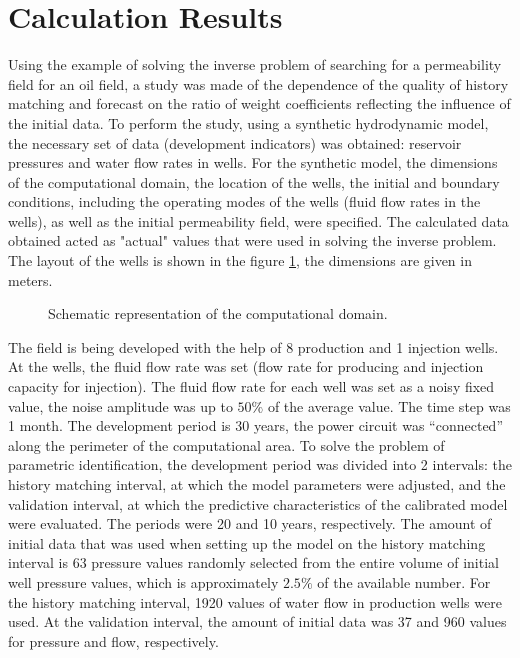 \documentclass[
11pt,%
tightenlines,%
twoside,%
onecolumn,%
nofloats,%
nobibnotes,%
nofootinbib,%
superscriptaddress,%
noshowpacs,%
centertags]%
{revtex4}
\begin{document}
\section{Calculation Results}
Using the example of solving the inverse problem of searching for a permeability field for an oil field, a study was made of the dependence of the quality of history matching and forecast on the ratio of weight coefficients reflecting the influence of the initial data. To perform the study, using a synthetic hydrodynamic model, the necessary set of data (development indicators) was obtained: reservoir pressures and water flow rates in wells. For the synthetic model, the dimensions of the computational domain, the location of the wells, the initial and boundary conditions, including the operating modes of the wells (fluid flow rates in the wells), as well as the initial permeability field, were specified. The calculated data obtained acted as "actual" values that were used in solving the inverse problem. The layout of the wells is shown in the figure \ref{fig:map}, the dimensions are given in meters.
\begin{figure}
    \caption{Schematic representation of the computational domain.}
	\label{fig:map}
\end{figure}

The field is being developed with the help of 8 production and 1 injection wells. At the wells, the fluid flow rate was set (flow rate for producing and injection capacity for injection). The fluid flow rate for each well was set as a noisy fixed value, the noise amplitude was up to $50\%$ of the average value. The time step was 1 month. The development period is 30 years, the power circuit was “connected” along the perimeter of the computational area. To solve the problem of parametric identification, the development period was divided into 2 intervals: the history matching interval, at which the model parameters were adjusted, and the validation interval, at which the predictive characteristics of the calibrated model were evaluated. The periods were 20 and 10 years, respectively. The amount of initial data that was used when setting up the model on the history matching interval is 63 pressure values randomly selected from the entire volume of initial well pressure values, which is approximately $2.5\%$ of the available number. For the history matching interval, 1920 values of water flow in production wells were used. At the validation interval, the amount of initial data was 37 and 960 values for pressure and flow, respectively.
\end{document}
